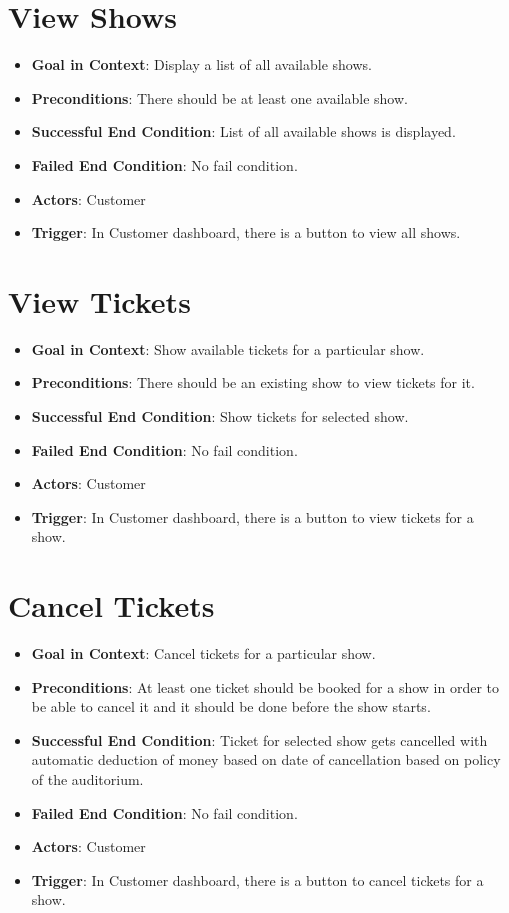 \documentclass{scrreprt}
\begin{document}
\section{View Shows}
\begin{itemize}
\item \textbf{Goal in Context}: Display a list of all available shows.
\item \textbf{Preconditions}: There should be at least one available show.
\item \textbf{Successful End Condition}: List of all available shows is displayed.
\item \textbf{Failed End Condition}: No fail condition. 
\item \textbf{Actors}: Customer
\item \textbf{Trigger}: In Customer dashboard, there is a button to view all shows.
\end{itemize}


\section{View Tickets}
\begin{itemize}
\item \textbf{Goal in Context}: Show available tickets for a particular show.
\item \textbf{Preconditions}: There should be an existing show to view tickets for it.
\item \textbf{Successful End Condition}: Show tickets for selected show. 
\item \textbf{Failed End Condition}: No fail condition.
\item \textbf{Actors}: Customer
\item \textbf{Trigger}: In Customer dashboard, there is a button to view tickets for a show.
\end{itemize}


\section{Cancel Tickets}
\begin{itemize}
\item \textbf{Goal in Context}: Cancel tickets for a particular show.
\item \textbf{Preconditions}: At least one ticket should be booked for a show in order to be able to cancel it and it should be done before the show starts. 
\item \textbf{Successful End Condition}: Ticket for selected show gets cancelled with automatic deduction of money based on date of cancellation based on policy of the auditorium.
\item \textbf{Failed End Condition}: No fail condition. 
\item \textbf{Actors}: Customer
\item \textbf{Trigger}: In Customer dashboard, there is a button to cancel tickets for a show.
\end{itemize}
\end{document}
